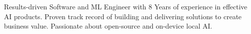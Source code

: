 

\begin{cvparagraph}

Results-driven Software and ML Engineer with 8 Years of experience in effective AI products. Proven track record of building and delivering solutions to create business value. Passionate about open-source and on-device local AI.
\end{cvparagraph}
